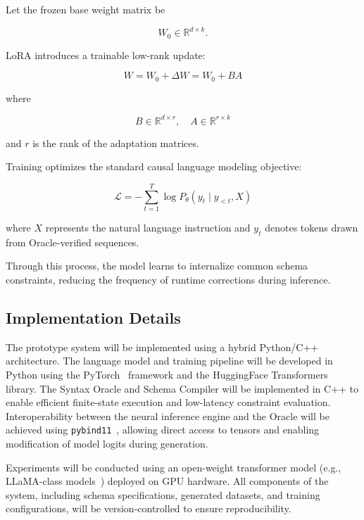 Let the frozen base weight matrix be

\begin{equation}
W_0 \in \mathbb{R}^{d \times k}.
\end{equation}

LoRA introduces a trainable low-rank update:

\begin{equation}
W = W_0 + \Delta W = W_0 + BA
\end{equation}

where

\begin{equation}
B \in \mathbb{R}^{d \times r}, \quad A \in \mathbb{R}^{r \times k}
\end{equation}

and $r$ is the rank of the adaptation matrices.

Training optimizes the standard causal language modeling objective:

\begin{equation}
\mathcal{L} = - \sum_{t=1}^{T} \log P_{\theta}(y_t \mid y_{<t}, X)
\end{equation}

where $X$ represents the natural language instruction and $y_t$ denotes 
tokens drawn from Oracle-verified sequences.

Through this process, the model learns to internalize common schema 
constraints, reducing the frequency of runtime corrections during inference.

\subsection{Implementation Details}
The prototype system will be implemented using a hybrid Python/C++ architecture. 
The language model and training pipeline will be developed in Python using the PyTorch~\cite{paszke2019pytorch} 
framework and the HuggingFace Transformers library. The Syntax Oracle and Schema Compiler 
will be implemented in C++ to enable efficient finite-state execution and low-latency 
constraint evaluation. Interoperability between the neural inference engine and the Oracle 
will be achieved using \texttt{pybind11}~\cite{jakob2024pybind11}, allowing direct access to tensors and enabling 
modification of model logits during generation.

Experiments will be conducted using an open-weight transformer model (e.g., LLaMA-class models~\cite{grattafiori2024llama}) 
deployed on GPU hardware. All components of the system, including schema specifications, 
generated datasets, and training configurations, will be version-controlled to 
ensure reproducibility.
